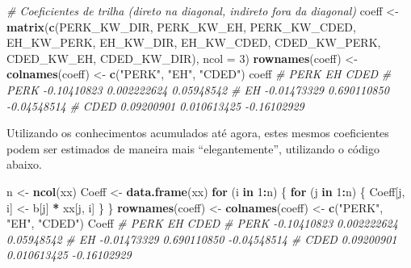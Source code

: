 \documentclass[
]{book}
\newenvironment{Shaded}{\begin{snugshade}}{\end{snugshade}}
\newcommand{\CommentTok}[1]{\textcolor[rgb]{0.56,0.35,0.01}{\textit{#1}}}
\newcommand{\ControlFlowTok}[1]{\textcolor[rgb]{0.13,0.29,0.53}{\textbf{#1}}}
\newcommand{\DataTypeTok}[1]{\textcolor[rgb]{0.13,0.29,0.53}{#1}}
\newcommand{\DecValTok}[1]{\textcolor[rgb]{0.00,0.00,0.81}{#1}}
\newcommand{\KeywordTok}[1]{\textcolor[rgb]{0.13,0.29,0.53}{\textbf{#1}}}
\newcommand{\NormalTok}[1]{#1}
\newcommand{\OperatorTok}[1]{\textcolor[rgb]{0.81,0.36,0.00}{\textbf{#1}}}
\newcommand{\StringTok}[1]{\textcolor[rgb]{0.31,0.60,0.02}{#1}}
\numberwithin{equation}{section}
\begin{document}
\begin{Shaded}
\begin{Highlighting}[]
\CommentTok{\# Coeficientes de trilha (direto na diagonal, indireto fora da diagonal)}
\NormalTok{coeff \textless{}{-}}\StringTok{ }\KeywordTok{matrix}\NormalTok{(}\KeywordTok{c}\NormalTok{(PERK\_KW\_DIR, PERK\_KW\_EH, PERK\_KW\_CDED,}
\NormalTok{                  EH\_KW\_PERK, EH\_KW\_DIR, EH\_KW\_CDED,}
\NormalTok{                  CDED\_KW\_PERK, CDED\_KW\_EH, CDED\_KW\_DIR),}
                \DataTypeTok{ncol =} \DecValTok{3}\NormalTok{)}
\KeywordTok{rownames}\NormalTok{(coeff) \textless{}{-}}\StringTok{ }\KeywordTok{colnames}\NormalTok{(coeff) \textless{}{-}}\StringTok{ }\KeywordTok{c}\NormalTok{(}\StringTok{"PERK"}\NormalTok{, }\StringTok{"EH"}\NormalTok{, }\StringTok{"CDED"}\NormalTok{)}
\NormalTok{coeff}
\CommentTok{\#             PERK          EH        CDED}
\CommentTok{\# PERK {-}0.10410823 0.002222624  0.05948542}
\CommentTok{\# EH   {-}0.01473329 0.690110850 {-}0.04548514}
\CommentTok{\# CDED  0.09200901 0.010613425 {-}0.16102929}
\end{Highlighting}
\end{Shaded}

Utilizando os conhecimentos acumulados até agora, estes mesmos coeficientes podem ser estimados de maneira mais ``elegantemente'', utilizando o código abaixo.

\begin{Shaded}
\begin{Highlighting}[]
\NormalTok{n \textless{}{-}}\StringTok{ }\KeywordTok{ncol}\NormalTok{(xx)}
\NormalTok{Coeff \textless{}{-}}\StringTok{ }\KeywordTok{data.frame}\NormalTok{(xx)}
\ControlFlowTok{for}\NormalTok{ (i }\ControlFlowTok{in} \DecValTok{1}\OperatorTok{:}\NormalTok{n) \{}
  \ControlFlowTok{for}\NormalTok{ (j }\ControlFlowTok{in} \DecValTok{1}\OperatorTok{:}\NormalTok{n) \{}
\NormalTok{    Coeff[j, i] \textless{}{-}}\StringTok{ }\NormalTok{b[j] }\OperatorTok{*}\StringTok{ }\NormalTok{xx[j, i]}
\NormalTok{  \}}
\NormalTok{\}}
\KeywordTok{rownames}\NormalTok{(coeff) \textless{}{-}}\StringTok{ }\KeywordTok{colnames}\NormalTok{(coeff) \textless{}{-}}\StringTok{ }\KeywordTok{c}\NormalTok{(}\StringTok{"PERK"}\NormalTok{, }\StringTok{"EH"}\NormalTok{, }\StringTok{"CDED"}\NormalTok{)}
\NormalTok{Coeff}
\CommentTok{\#             PERK          EH        CDED}
\CommentTok{\# PERK {-}0.10410823 0.002222624  0.05948542}
\CommentTok{\# EH   {-}0.01473329 0.690110850 {-}0.04548514}
\CommentTok{\# CDED  0.09200901 0.010613425 {-}0.16102929}
\end{Highlighting}
\end{Shaded}
\end{document}
